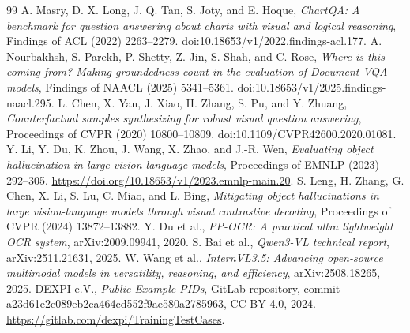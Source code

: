 \documentclass[11pt]{article}
\begin{document}
\begin{thebibliography}{99}
 A. Masry, D. X. Long, J. Q. Tan, S. Joty, and E. Hoque, \emph{ChartQA: A benchmark for question answering about charts with visual and logical reasoning}, Findings of ACL (2022) 2263--2279. doi:10.18653/v1/2022.findings-acl.177.
 A. Nourbakhsh, S. Parekh, P. Shetty, Z. Jin, S. Shah, and C. Rose, \emph{Where is this coming from? Making groundedness count in the evaluation of Document VQA models}, Findings of NAACL (2025) 5341--5361. doi:10.18653/v1/2025.findings-naacl.295.
 L. Chen, X. Yan, J. Xiao, H. Zhang, S. Pu, and Y. Zhuang, \emph{Counterfactual samples synthesizing for robust visual question answering}, Proceedings of CVPR (2020) 10800--10809. doi:10.1109/CVPR42600.2020.01081.
 Y. Li, Y. Du, K. Zhou, J. Wang, X. Zhao, and J.-R. Wen, \emph{Evaluating object hallucination in large vision-language models}, Proceedings of EMNLP (2023) 292--305. \url{https://doi.org/10.18653/v1/2023.emnlp-main.20}.
 S. Leng, H. Zhang, G. Chen, X. Li, S. Lu, C. Miao, and L. Bing, \emph{Mitigating object hallucinations in large vision-language models through visual contrastive decoding}, Proceedings of CVPR (2024) 13872--13882.
 Y. Du et al., \emph{PP-OCR: A practical ultra lightweight OCR system}, arXiv:2009.09941, 2020.
 S. Bai et al., \emph{Qwen3-VL technical report}, arXiv:2511.21631, 2025.
 W. Wang et al., \emph{InternVL3.5: Advancing open-source multimodal models in versatility, reasoning, and efficiency}, arXiv:2508.18265, 2025.
 DEXPI e.V., \emph{Public Example PIDs}, GitLab repository, commit a23d61e2e089eb2ca464cd552f9ae580a2785963, CC BY 4.0, 2024. \url{https://gitlab.com/dexpi/TrainingTestCases}.
\end{thebibliography}
\end{document}
